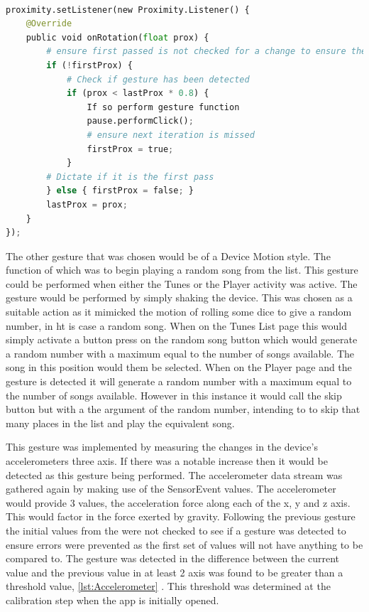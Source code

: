 \documentclass{l4proj}
\begin{document}
\begin{lstlisting}[language=python, float, caption={Java code detailing how the Pause/Play Gesture is detected and how it is acted upon.}, label=lst:Proximity]

proximity.setListener(new Proximity.Listener() {
    @Override
    public void onRotation(float prox) {
        # ensure first passed is not checked for a change to ensure there is a previous value to compare to
        if (!firstProx) {
            # Check if gesture has been detected
            if (prox < lastProx * 0.8) {
                If so perform gesture function
                pause.performClick();
                # ensure next iteration is missed
                firstProx = true;
            }
        # Dictate if it is the first pass
        } else { firstProx = false; }
        lastProx = prox;
    }
});
\end{lstlisting}

The other gesture that was chosen would be of a Device Motion style. The function of which was to begin playing a random song from the list. This gesture could be performed when either the Tunes or the Player activity was active. The gesture would be performed by simply shaking the device. This was chosen as a suitable action as it mimicked the motion of rolling some dice to give a random number, in ht is case a random song. When on the Tunes List page this would simply activate a button press on the random song button which would generate a random number with a maximum equal to the number of songs available. The song in this position would them be selected. When on the Player page and the gesture is detected it will generate a random number with a maximum equal to the number of songs available. However in this instance it would call the skip button but with a the argument of the random number, intending to to skip that many places in the list and play the equivalent song.

This gesture was implemented by measuring the changes in the device's accelerometers three axis. If there was a notable increase then it would be detected as this gesture being performed. The accelerometer data stream was gathered again by making use of the SensorEvent values. The accelerometer would provide 3 values, the acceleration force along each of the x, y and z axis. This would factor in the force exerted by gravity. Following the previous gesture the initial values from the were not checked to see if a gesture was detected to ensure errors were prevented as the first set of values will not have anything to be compared to. The gesture was detected in the difference between the current value and the previous value in at least 2 axis was found to be greater than a threshold value, \ref{lst:Accelerometer} . This threshold was determined at the calibration step when the app is initially opened. 
\end{document}
